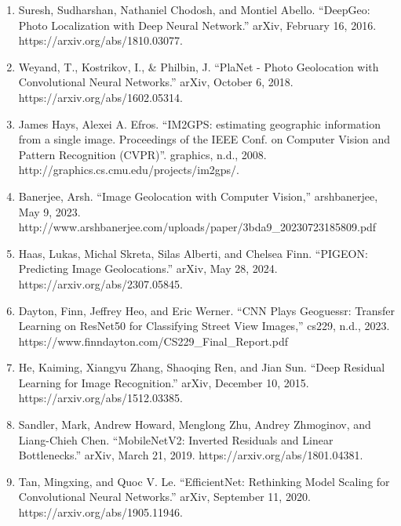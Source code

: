 \documentclass{article}
\providecommand{\tightlist}{%
  \setlength{\itemsep}{0pt}\setlength{\parskip}{0pt}}
\begin{document}
\begin{enumerate}
\def\labelenumi{\arabic{enumi}.}
\tightlist
\item
  Suresh, Sudharshan, Nathaniel Chodosh, and Montiel Abello. ``DeepGeo:
  Photo Localization with Deep Neural Network.'' arXiv, February 16,
  2016. https://arxiv.org/abs/1810.03077.
\item
  Weyand, T., Kostrikov, I., \& Philbin, J. ``PlaNet - Photo Geolocation
  with Convolutional Neural Networks.'' arXiv, October 6, 2018.
  https://arxiv.org/abs/1602.05314.
\item
  James Hays, Alexei A. Efros. ``IM2GPS: estimating geographic
  information from a single image. Proceedings of the IEEE Conf. on
  Computer Vision and Pattern Recognition (CVPR)''. graphics, n.d.,
  2008. http://graphics.cs.cmu.edu/projects/im2gps/.
\item
  Banerjee, Arsh. ``Image Geolocation with Computer Vision,''
  arshbanerjee, May 9, 2023.
  http://www.arshbanerjee.com/uploads/paper/3bda9\_20230723185809.pdf
\item
  Haas, Lukas, Michal Skreta, Silas Alberti, and Chelsea Finn. ``PIGEON:
  Predicting Image Geolocations.'' arXiv, May 28, 2024.
  https://arxiv.org/abs/2307.05845.
\item
  Dayton, Finn, Jeffrey Heo, and Eric Werner. ``CNN Plays Geoguessr:
  Transfer Learning on ResNet50 for Classifying Street View Images,''
  cs229, n.d., 2023. https://www.finndayton.com/CS229\_Final\_Report.pdf
\item
  He, Kaiming, Xiangyu Zhang, Shaoqing Ren, and Jian Sun. ``Deep
  Residual Learning for Image Recognition.'' arXiv, December 10, 2015.
  https://arxiv.org/abs/1512.03385.
\item
  Sandler, Mark, Andrew Howard, Menglong Zhu, Andrey Zhmoginov, and
  Liang-Chieh Chen. ``MobileNetV2: Inverted Residuals and Linear
  Bottlenecks.'' arXiv, March 21, 2019.
  https://arxiv.org/abs/1801.04381.
\item
  Tan, Mingxing, and Quoc V. Le. ``EfficientNet: Rethinking Model
  Scaling for Convolutional Neural Networks.'' arXiv, September 11,
  2020. https://arxiv.org/abs/1905.11946.
\end{enumerate}

\end{document}
